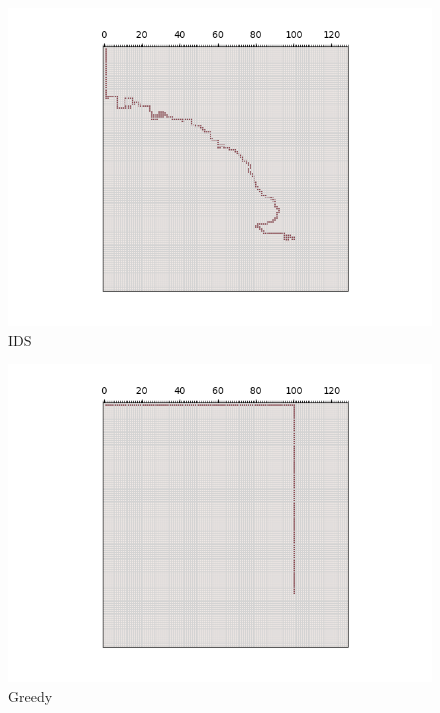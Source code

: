 \documentclass{article}
\begin{document}
\begin{figure}[H]
	\centering
	\includegraphics[width=1.0\textwidth]{../images/paths/IDS.png}
	\caption{IDS}
\end{figure}

\begin{figure}[H]
	\centering
	\includegraphics[width=1.0\textwidth]{../images/paths/Greedy.png}
	\caption{Greedy}
\end{figure}
\end{document}
